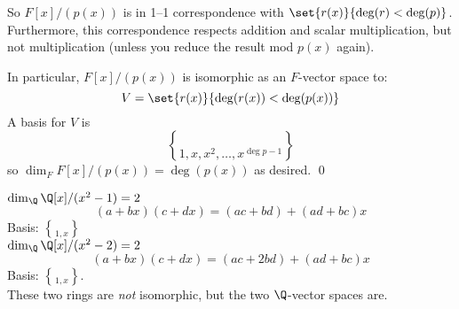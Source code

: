 So $F[x]/(p(x))$ is in 1--1 correspondence with $\set{r(x)}{\deg(r)<\deg(p)}$.  Furthermore, this correspondence respects addition and scalar multiplication, but not multiplication (unless you reduce the result mod $p(x)$ again).

In particular, $F[x]/(p(x))$ is isomorphic as an $F$-vector space to:
\[ V = \set{r(x)}{\deg(r(x))<\deg(p(x))} \]
A basis for $V$ is
\[ \brace{1,x,x^2,\dotsc,x^{\deg p-1}} \]
so $\dim_F F[x]/(p(x))=\deg(p(x))$ as desired. \qed

\eg $\dim_\Q \Q[x]/(x^2-1)=2$%
\[ (a+bx)(c+dx) = (ac+bd)+(ad+bc)x \]
Basis: $\brace{1,x}$ \\
\eg $\dim_\Q \Q[x]/(x^2-2)=2$%
\[ (a+bx)(c+dx) = (ac+2bd)+(ad+bc)x \]
Basis: $\brace{1,x}$. \\
These two rings are \emph{not} isomorphic, but the two $\Q$-vector spaces are.
